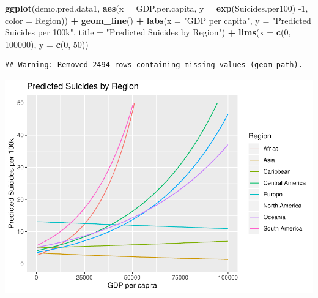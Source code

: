 \documentclass[11pt,]{article}
\newenvironment{Shaded}{\begin{snugshade}}{\end{snugshade}}
\newcommand{\DataTypeTok}[1]{\textcolor[rgb]{0.13,0.29,0.53}{#1}}
\newcommand{\DecValTok}[1]{\textcolor[rgb]{0.00,0.00,0.81}{#1}}
\newcommand{\KeywordTok}[1]{\textcolor[rgb]{0.13,0.29,0.53}{\textbf{#1}}}
\newcommand{\NormalTok}[1]{#1}
\newcommand{\OperatorTok}[1]{\textcolor[rgb]{0.81,0.36,0.00}{\textbf{#1}}}
\newcommand{\StringTok}[1]{\textcolor[rgb]{0.31,0.60,0.02}{#1}}
\begin{document}
\begin{Shaded}
\begin{Highlighting}[]
\KeywordTok{ggplot}\NormalTok{(demo.pred.data1, }\KeywordTok{aes}\NormalTok{(}\DataTypeTok{x =}\NormalTok{ GDP.per.capita, }\DataTypeTok{y =} \KeywordTok{exp}\NormalTok{(Suicides.per100) }\DecValTok{-1}\NormalTok{, }\DataTypeTok{color =}\NormalTok{ Region)) }\OperatorTok{+}\StringTok{ }
\StringTok{  }\KeywordTok{geom_line}\NormalTok{() }\OperatorTok{+}\StringTok{ }
\StringTok{  }\KeywordTok{labs}\NormalTok{(}\DataTypeTok{x =} \StringTok{"GDP per capita"}\NormalTok{, }\DataTypeTok{y =} \StringTok{"Predicted Suicides per 100k"}\NormalTok{, }\DataTypeTok{title =} \StringTok{"Predicted Suicides by Region"}\NormalTok{) }\OperatorTok{+}
\StringTok{  }\KeywordTok{lims}\NormalTok{(}\DataTypeTok{x =} \KeywordTok{c}\NormalTok{(}\DecValTok{0}\NormalTok{, }\DecValTok{100000}\NormalTok{), }\DataTypeTok{y =} \KeywordTok{c}\NormalTok{(}\DecValTok{0}\NormalTok{, }\DecValTok{50}\NormalTok{))}
\end{Highlighting}
\end{Shaded}

\begin{verbatim}
## Warning: Removed 2494 rows containing missing values (geom_path).
\end{verbatim}

\includegraphics{An-Analysis-of-Suicide-Data_files/figure-latex/unnamed-chunk-15-1.pdf}





\newpage
\singlespacing 
\end{document}
